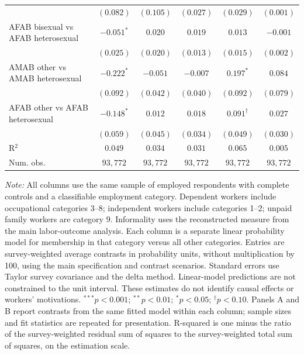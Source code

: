 \begin{table}[htpb!]
{\begin{tabular}{l c c c c c}
 & $(0.082)$ & $(0.105)$ & $(0.027)$ & $(0.029)$ & $(0.001)$ \\
AFAB bisexual vs AFAB heterosexual & $-0.051^{*}$ & $0.020$ & $0.019$ & $0.013$ & $-0.001$ \\
 & $(0.025)$ & $(0.020)$ & $(0.013)$ & $(0.015)$ & $(0.002)$ \\
AMAB other vs AMAB heterosexual & $-0.222^{*}$ & $-0.051$ & $-0.007$ & $0.197^{*}$ & $0.084$ \\
 & $(0.092)$ & $(0.042)$ & $(0.040)$ & $(0.092)$ & $(0.079)$ \\
AFAB other vs AFAB heterosexual & $-0.148^{*}$ & $0.012$ & $0.018$ & $0.091^{\dagger}$ & $0.027$ \\
 & $(0.059)$ & $(0.045)$ & $(0.034)$ & $(0.049)$ & $(0.030)$ \\
\hline
R$^2$ & $0.049$ & $0.034$ & $0.031$ & $0.065$ & $0.005$ \\
Num. obs. & $93,772$ & $93,772$ & $93,772$ & $93,772$ & $93,772$ \\
\hline
\end{tabular}%
}
\par\vspace{1ex}
\begin{minipage}{\textwidth}\footnotesize\raggedright
\textit{Note:} All columns use the same sample of employed respondents with complete controls and a classifiable employment category. Dependent workers include occupational categories 3--8; independent workers include categories 1--2; unpaid family workers are category 9. Informality uses the reconstructed measure from the main labor-outcome analysis. Each column is a separate linear probability model for membership in that category versus all other categories. Entries are survey-weighted average contrasts in probability units, without multiplication by 100, using the main specification and contrast scenarios. Standard errors use Taylor survey covariance and the delta method. Linear-model predictions are not constrained to the unit interval. These estimates do not identify causal effects or workers' motivations. $^{***}p<0.001$; $^{**}p<0.01$; $^{*}p<0.05$; $^{\dagger}p<0.10$. Panels A and B report contrasts from the same fitted model within each column; sample sizes and fit statistics are repeated for presentation. R-squared is one minus the ratio of the survey-weighted residual sum of squares to the survey-weighted total sum of squares, on the estimation scale.
\end{minipage}
\end{table}

